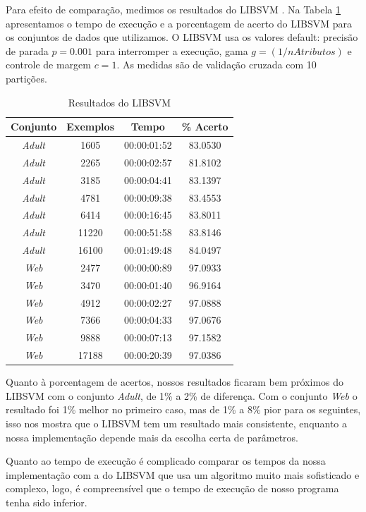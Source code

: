 Para efeito de comparação, medimos os resultados do LIBSVM \cite{art:LIBSVM}. Na Tabela \ref{tab:libsvmResults} apresentamos o tempo de execução e a porcentagem de acerto do LIBSVM para os conjuntos de dados que utilizamos. O LIBSVM usa os valores default: precisão de parada $p=0.001$ para interromper a execução, gama $g=(1/nAtributos)$ e controle de margem $c=1$. As medidas são de validação cruzada com 10 partições.
\begin{table}
    \caption{Resultados do LIBSVM}
    \label{tab:libsvmResults}
    \small
    \centering
    \begin{tabular}{|c|c|c|c|} \hline
        Conjunto & Exemplos & Tempo & \% Acerto \\ \hline
        \em{Adult} & 1605 & 00:00:01:52 & 83.0530 \\ \hline
        \em{Adult} & 2265 &  00:00:02:57 & 81.8102 \\ \hline
        \em{Adult} & 3185 &  00:00:04:41 & 83.1397 \\ \hline
        \em{Adult} & 4781 & 00:00:09:38 & 83.4553 \\ \hline
        \em{Adult} & 6414 & 00:00:16:45 & 83.8011 \\ \hline
        \em{Adult} & 11220 & 00:00:51:58 & 83.8146 \\ \hline
        \em{Adult} & 16100 & 00:01:49:48 & 84.0497 \\ \hline
        \em{Web} & 2477 & 00:00:00:89 & 97.0933 \\ \hline
        \em{Web} & 3470 & 00:00:01:40 & 96.9164 \\ \hline
        \em{Web} & 4912 & 00:00:02:27 & 97.0888 \\ \hline
        \em{Web} & 7366 & 00:00:04:33 & 97.0676 \\ \hline
        \em{Web} & 9888 & 00:00:07:13 & 97.1582 \\ \hline
        \em{Web} & 17188 & 00:00:20:39 & 97.0386 \\ \hline
    \end{tabular}
\end{table}

Quanto à porcentagem de acertos, nossos resultados ficaram bem próximos do LIBSVM com o conjunto {\em Adult}, de 1\% a 2\% de diferença. Com o conjunto {\em Web} o resultado foi 1\% melhor no primeiro caso, mas de 1\% a 8\% pior para os seguintes, isso nos mostra que o LIBSVM tem um resultado mais consistente, enquanto a nossa implementação depende mais da escolha certa de parâmetros.

Quanto ao tempo de execução é complicado comparar os tempos da nossa implementação com a do LIBSVM que usa um algoritmo muito mais sofisticado e complexo, logo, é compreensível que o tempo de execução de nosso programa tenha sido inferior.


